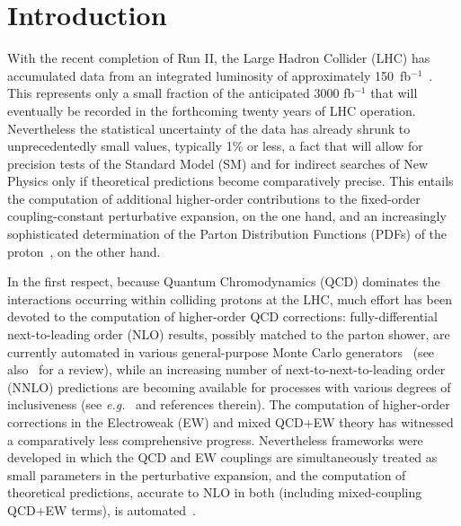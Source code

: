 \section{Introduction}
\label{sec:introduction}

With the recent completion of Run II, the Large Hadron Collider (LHC) has 
accumulated data from an integrated luminosity of approximately 
150~fb$^{-1}$~\cite{Mangano:2020icy}. This represents only a small fraction of 
the anticipated 3000 fb$^{-1}$ that will eventually be recorded in the 
forthcoming twenty years of LHC operation. Nevertheless the statistical 
uncertainty of the data has already shrunk to unprecedentedly small values,
typically 1\% or less, a fact that will allow for precision tests of the 
Standard Model (SM) and for indirect searches of New Physics only if 
theoretical predictions become comparatively precise. This entails the 
computation of additional higher-order contributions to the fixed-order 
coupling-constant perturbative expansion, on the one hand, and an increasingly 
sophisticated determination of the Parton Distribution Functions (PDFs) of the 
proton~\cite{Gao:2017yyd}, on the other hand. 

In the first respect, because Quantum Chromodynamics (QCD) dominates the 
interactions occurring within colliding protons at the LHC, much effort 
has been devoted to the computation of higher-order QCD corrections: 
fully-differential next-to-leading order (NLO) results, possibly matched to the
parton shower, are currently automated in various general-purpose
Monte Carlo generators~\cite{Gleisberg:2008ta,Alwall:2014hca,Bellm:2015jjp}
(see also~\cite{Buckley:2011ms} for a review),
while an increasing number of next-to-next-to-leading order (NNLO) predictions 
are becoming available for processes with various degrees of inclusiveness
(see {\it e.g.}~\cite{Amoroso:2020lgh} and references therein). The computation
of higher-order corrections in the Electroweak (EW) and mixed QCD+EW theory has 
witnessed a comparatively less comprehensive progress. Nevertheless frameworks 
were developed in which the QCD and EW couplings are simultaneously treated as 
small parameters in the perturbative expansion, and the computation of 
theoretical predictions, accurate to NLO in both (including mixed-coupling 
QCD+EW terms), is automated~\cite{Biedermann:2017yoi,Frederix:2018nkq}.

